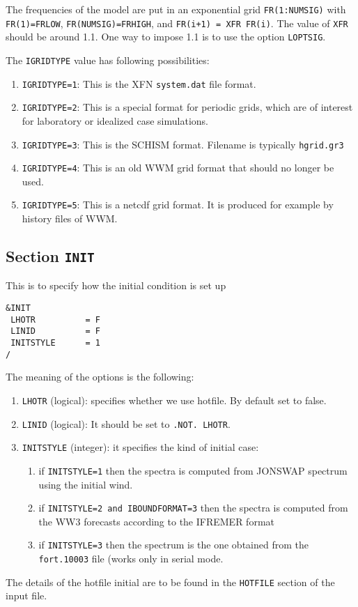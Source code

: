 \documentclass[12pt]{amsart}
\begin{document}
The frequencies of the model are put in an exponential grid {\tt FR(1:NUMSIG)} with {\tt FR(1)=FRLOW}, {\tt FR(NUMSIG)=FRHIGH}, and {\tt FR(i+1) = XFR FR(i)}. The value of {\tt XFR} should be around 1.1. One way to impose 1.1 is to use the option {\tt LOPTSIG}.

The {\tt IGRIDTYPE} value has following possibilities:
\begin{enumerate}
\item {\tt IGRIDTYPE=1}: This is the XFN {\tt system.dat} file format.
\item {\tt IGRIDTYPE=2}: This is a special format for periodic grids, which are of interest for laboratory or idealized case simulations.
\item {\tt IGRIDTYPE=3}: This is the SCHISM format. Filename is typically {\tt hgrid.gr3}
\item {\tt IGRIDTYPE=4}: This is an old WWM grid format that should no longer be used.
\item {\tt IGRIDTYPE=5}: This is a netcdf grid format. It is produced for example by history files of WWM.
\end{enumerate}




\subsection{Section {\tt INIT}}
This is to specify how the initial condition is set up
\begin{verbatim}
&INIT
 LHOTR          = F   
 LINID          = F   
 INITSTYLE      = 1   
/
\end{verbatim}
The meaning of the options is the following:
\begin{enumerate}
\item {\tt LHOTR} (logical): specifies whether we use hotfile. By default set to false.
\item {\tt LINID} (logical): It should be set to {\tt .NOT. LHOTR}.
\item {\tt INITSTYLE} (integer): it specifies the kind of initial case:
  \begin{enumerate}
  \item if {\tt INITSTYLE=1} then the spectra is computed from JONSWAP spectrum using the initial wind.
  \item if {\tt INITSTYLE=2 and IBOUNDFORMAT=3} then the spectra is computed from the WW3 forecasts according to the IFREMER format
  \item if {\tt INITSTYLE=3} then the spectrum is the one obtained from the {\tt fort.10003} file (works only in serial mode.
  \end{enumerate}
\end{enumerate}
The details of the hotfile initial are to be found in the {\tt HOTFILE} section of the input file.
\end{document}
